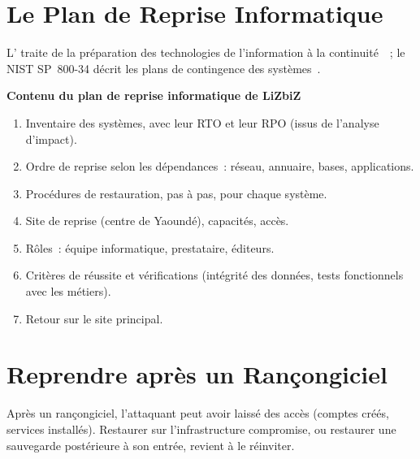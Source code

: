 \section{Le Plan de Reprise Informatique}
\label{sec:c19-pra}

L' traite de la préparation des technologies de
l'information à la continuité~\cite{iso27031_2011}~; le NIST SP~800-34 décrit
les plans de contingence des systèmes~\cite{nist80034}.

\begin{boxprocedure}
\textbf{Contenu du plan de reprise informatique de LiZbiZ}
\begin{enumerate}
    \item Inventaire des systèmes, avec leur RTO et leur RPO (issus de
          l'analyse d'impact).
    \item Ordre de reprise selon les dépendances~: réseau, annuaire, bases,
          applications.
    \item Procédures de restauration, pas à pas, pour chaque système.
    \item Site de reprise (centre de Yaoundé), capacités, accès.
    \item Rôles~: équipe informatique, prestataire, éditeurs.
    \item Critères de réussite et vérifications (intégrité des données,
          tests fonctionnels avec les métiers).
    \item Retour sur le site principal.
\end{enumerate}
\end{boxprocedure}

\section{Reprendre après un Rançongiciel}
\label{sec:c19-rancon}

Après un rançongiciel, l'attaquant peut avoir laissé des accès (comptes
créés, services installés). Restaurer sur l'infrastructure compromise, ou
restaurer une sauvegarde postérieure à son entrée, revient à le réinviter.

